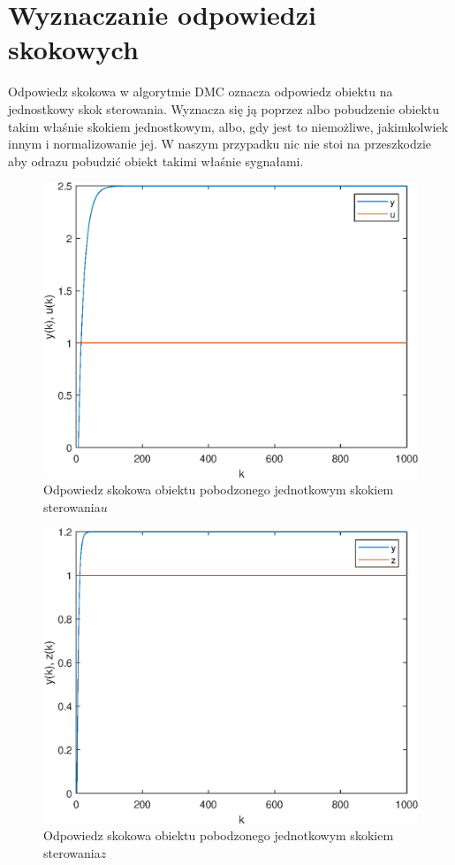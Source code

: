 \chapter{Wyznaczanie odpowiedzi skokowych}
Odpowiedz skokowa w algorytmie DMC oznacza odpowiedz obiektu na jednostkowy skok sterowania. Wyznacza się ją poprzez albo pobudzenie obiektu takim właśnie skokiem jednostkowym, albo, gdy jest to niemożliwe, jakimkolwiek innym i normalizowanie jej. W naszym przypadku nic nie stoi na przeszkodzie aby odrazu pobudzić obiekt takimi właśnie sygnałami.

\begin{figure}[h!]
	\centering
	\includegraphics[scale=1]{Rys/odp_skok_u.eps}
	\caption{Odpowiedz skokowa obiektu pobodzonego jednotkowym skokiem sterowania$u$}
	\label{Rys:odp_skok_u}
\end{figure}
\begin{figure}[h!]
	\centering
	\includegraphics[scale=1]{Rys/odp_skok_z.eps}
	\caption{Odpowiedz skokowa obiektu pobodzonego jednotkowym skokiem sterowania$z$}
	\label{Rys:odp_skok_z}
\end{figure}
